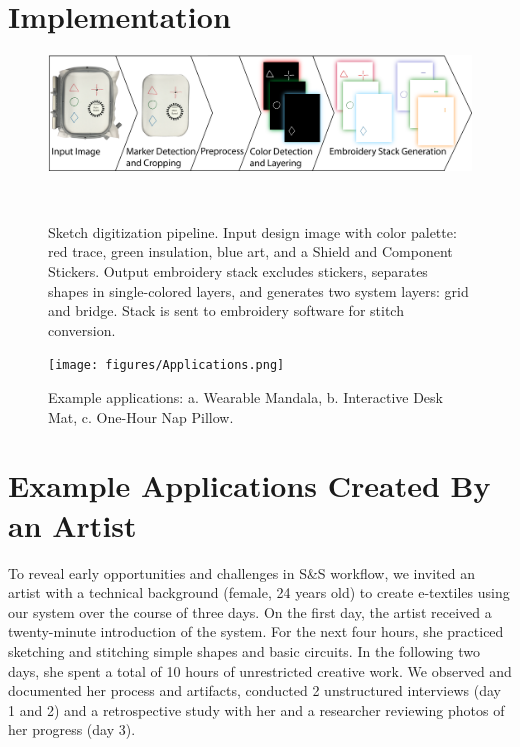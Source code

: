\documentclass[header.tex]{subfiles}
\begin{document}
\section{Implementation}
 \begin{figure}[h!]
\centering
  \includegraphics[width=1.0\columnwidth]{figures/Pipeline}
  \caption{Sketch digitization pipeline. Input design image with color palette: red trace, green insulation, blue art, and a Shield and Component Stickers. Output embroidery stack excludes stickers, separates shapes in single-colored layers, and generates two system layers: grid and bridge. Stack is sent to embroidery software for stitch conversion.}~\label{fig:Pipeline}
  \vspace{-1.2em}
  \end{figure}

\begin{figure}[t!]
\centering
\texttt{[image: figures/Applications.png]}
\caption{Example applications: a. Wearable Mandala, b. Interactive Desk Mat, c. One-Hour Nap Pillow.}
 \vspace{-1.2em}
\label{fig:Applications}
\end{figure}






\section{Example Applications Created By an Artist} %
To reveal early opportunities and challenges in S\&S workflow, we invited an artist with a technical background (female, 24 years old) to create e-textiles using our system over the course of three days. On the first day, the artist received a twenty-minute introduction of the system. For the next four hours, she practiced sketching and stitching simple shapes and basic circuits. In the following two days, she spent a total of 10 hours of unrestricted creative work. We observed and documented her process and artifacts, conducted 2 unstructured interviews (day 1 and 2) and a retrospective study with her and a researcher reviewing photos of her progress (day 3).
\end{document}

